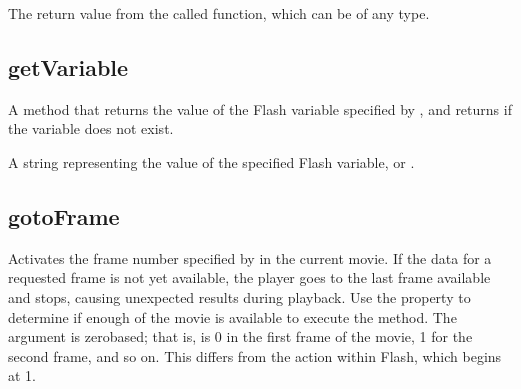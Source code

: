 \documentclass[letterpaper,12pt,english,openany,oneside]{sphinxmanual}
\begin{document}
\label{\detokenize{JS_3D_API:section-25}}\label{\detokenize{JS_3D_API:returns-21}}

The return value from the called function, which can be of any type.


\subsection{getVariable}
\label{\detokenize{JS_3D_API:getvariable}}
A method that returns the value of the Flash variable specified by  , and returns  if the variable does not exist.

\label{\detokenize{JS_3D_API:syntax-22}}

\begin{sphinxVerbatim}[commandchars=\\\{\}]
\end{sphinxVerbatim}
\label{\detokenize{JS_3D_API:parameters-15}}

\label{\detokenize{JS_3D_API:section-26}}\label{\detokenize{JS_3D_API:returns-22}}

A string representing the value of the specified Flash variable, or .


\subsection{gotoFrame}
\label{\detokenize{JS_3D_API:gotoframe}}
Activates the frame number specified by  in the current movie. If the data for a requested frame is not yet available, the player goes to the last frame available and stops, causing unexpected results during playback. Use the  property to determine if enough of the movie is available to execute the  method. The argument  is zero\sphinxhyphen{}based; that is,  is 0 in the first frame of the movie, 1 for the second frame, and so on. This differs from the  action within Flash, which begins at 1.

\label{\detokenize{JS_3D_API:syntax-23}}
\end{document}
